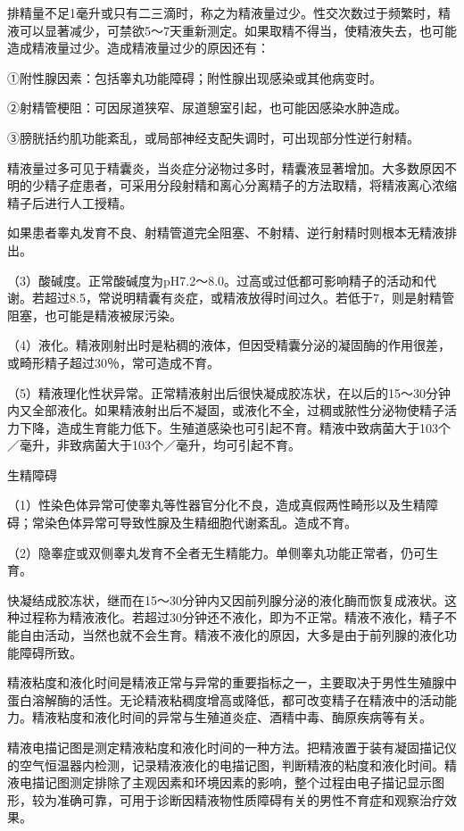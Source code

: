 \documentclass[12pt,UTF8]{ctexbook}
\begin{document}
排精量不足1毫升或只有二三滴时，称之为精液量过少。性交次数过于频繁时，精液可以显著减少，可禁欲5～7天重新测定。如果取精不得当，使精液失去，也可能造成精液量过少。造成精液量过少的原因还有：

①附性腺因素：包括睾丸功能障碍；附性腺出现感染或其他病变时。

②射精管梗阻：可因尿道狭窄、尿道憩室引起，也可能因感染水肿造成。

③膀胱括约肌功能紊乱，或局部神经支配失调时，可出现部分性逆行射精。

精液量过多可见于精囊炎，当炎症分泌物过多时，精囊液显著增加。大多数原因不明的少精子症患者，可采用分段射精和离心分离精子的方法取精，将精液离心浓缩精子后进行人工授精。

如果患者睾丸发育不良、射精管道完全阻塞、不射精、逆行射精时则根本无精液排出。

（3）酸碱度。正常酸碱度为pH7.2～8.0。过高或过低都可影响精子的活动和代谢。若超过8.5，常说明精囊有炎症，或精液放得时间过久。若低于7，则是射精管阻塞，也可能是精液被尿污染。

（4）液化。精液刚射出时是粘稠的液体，但因受精囊分泌的凝固酶的作用很差，或畸形精子超过30％，常可造成不育。

（5）精液理化性状异常。正常精液射出后很快凝成胶冻状，在以后的15～30分钟内又全部液化。如果精液射出后不凝固，或液化不全，过稠或脓性分泌物使精子活力下降，造成生育能力低下。生殖道感染也可引起不育。精液中致病菌大于103个／毫升，非致病菌大于103个／毫升，均可引起不育。

生精障碍

（1）性染色体异常可使睾丸等性器官分化不良，造成真假两性畸形以及生精障碍；常染色体异常可导致性腺及生精细胞代谢紊乱。造成不育。

（2）隐睾症或双侧睾丸发育不全者无生精能力。单侧睾丸功能正常者，仍可生育。

快凝结成胶冻状，继而在15～30分钟内又因前列腺分泌的液化酶而恢复成液状。这种过程称为精液液化。若超过30分钟还不液化，即为不正常。精液不液化，精子不能自由活动，当然也就不会生育。精液不液化的原因，大多是由于前列腺的液化功能障碍所致。

精液粘度和液化时间是精液正常与异常的重要指标之一，主要取决于男性生殖腺中蛋白溶解酶的活性。无论精液粘稠度增高或降低，都可改变精子在精液中的活动能力。精液粘度和液化时间的异常与生殖道炎症、酒精中毒、酶原疾病等有关。

精液电描记图是测定精液粘度和液化时间的一种方法。把精液置于装有凝固描记仪的空气恒温器内检测，记录精液液化的电描记图，判断精液的粘度和液化时间。精液电描记图测定排除了主观因素和环境因素的影响，整个过程由电子描记显示图形，较为准确可靠，可用于诊断因精液物性质障碍有关的男性不育症和观察治疗效果。
\end{document}
